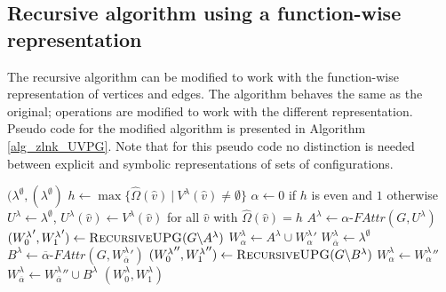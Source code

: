 \subsection{Recursive algorithm using a function-wise representation}
The recursive algorithm can be modified to work with the function-wise representation of vertices and edges. The algorithm behaves the same as the original; operations are modified to work with the different representation.  Pseudo code for the modified algorithm is presented in Algorithm \ref{alg_zlnk_UVPG}. Note that for this pseudo code no distinction is needed between explicit and symbolic representations of sets of configurations.
\begin{algorithm}
	\caption{$\textsc{RecursiveUPG}(\textit{unified parity game } G = (\\
		V^\lambda : \hat{V} \rightarrow 2^\mathfrak{C},\\
		\hat{V}_0 \subseteq \hat{V},\\
		\hat{V}_1 \subseteq \hat{V},\\
		E^\lambda : \hat{E} \rightarrow 2^\mathfrak{C},\\
		\hat{\Omega} : \hat{V}\rightarrow \mathbb{N}))$}\label{alg_zlnk_UVPG}
	\begin{algorithmic}[1]
		\State \Return $(\lambda^\emptyset, (\lambda^\emptyset)$
		\EndIf
		\State $h \gets \max\{ \hat{\Omega}(\hat{v})\ |\ V^\lambda(\hat{v}) \neq \emptyset \}$
		\State $\alpha \gets 0$ if $h$ is even and $1$ otherwise
		\State $U^\lambda \gets \lambda^\emptyset$, $U^\lambda(\hat{v}) \gets V^\lambda(\hat{v})$ for all $\hat{v}$ with $\hat{\Omega}(\hat{v}) = h$
		\State $A^\lambda \gets \alpha\textit{-FAttr}(G, U^\lambda)$
		\State $({W^\lambda_0}', {W^\lambda_1}') \gets \textsc{RecursiveUPG}(G \backslash A^\lambda)$
		\State $W^\lambda_\alpha \gets A^\lambda \cup {W^\lambda_\alpha}'$
		\State $W^\lambda_{\overline{\alpha}} \gets \lambda^\emptyset$
		\Else
		\State $B^\lambda \gets \overline{\alpha}\textit{-FAttr}(G,{W^\lambda_{\overline{\alpha}}}')$
		\State $({W^\lambda_0}'', {W^\lambda_1}'') \gets \textsc{RecursiveUPG}(G \backslash B^\lambda)$
		\State $W^\lambda_\alpha \gets {W^\lambda_\alpha}''$
		\State $W^\lambda_{\overline{\alpha}} \gets {W^\lambda_{\overline{\alpha}}}'' \cup B^\lambda$
		\EndIf
		\State \Return $(W^\lambda_0, W^\lambda_1)$
	\end{algorithmic}
\end{algorithm}

